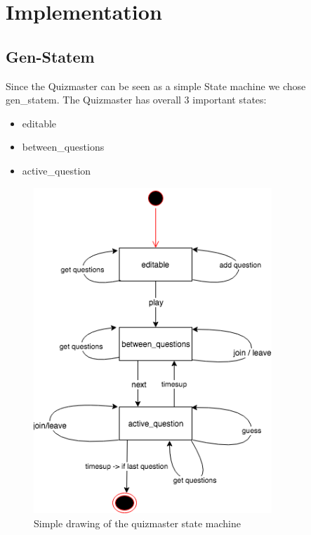 \documentclass[12pt,a4paper]{article}
\begin{document}
\section{Implementation}
\subsection{Gen-Statem}
Since the Quizmaster can be seen as a simple State machine we chose gen\_statem.
The Quizmaster has overall 3 important states:
\begin{itemize}
	\item editable
	\item between\_questions
	\item active\_question
\end{itemize} 

\begin{figure}
\begin{center}
		\includegraphics[width=0.8\textwidth]{images/Quizmaster}
\end{center}
	\caption{Simple drawing of the quizmaster state machine}
\end{figure}
\end{document}
